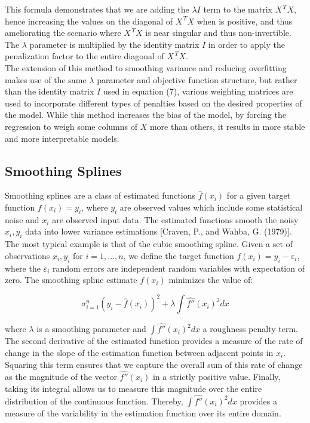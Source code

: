 \documentclass[12pt]{article}
\begin{document}
This formula demonstrates that we are adding the $\lambda I$ term to the matrix $X^{\, T}X$, hence increasing the values on the diagonal of $X^{\, T}X$ when  is positive, and thus ameliorating the scenario where $X^{\, T}X$ is near singular and thus non-invertible. The $\lambda$ parameter is multiplied by the identity matrix $I$ in order to apply the penalization factor to the entire diagonal of $X^{\, T}X$.\\

The extension of this method to smoothing variance and reducing overfitting makes use of the same $\lambda$ parameter and objective function structure, but rather than the identity matrix $I$ used in equation (7), various weighting matrices are used to incorporate different types of penalties based on the desired properties of the model. While this method increases the bias of the model, by forcing the regression to weigh some columns of $X$ more than others, it results in more stable and more interpretable models.

\subsection{Smoothing Splines}\label{subsec4}

Smoothing splines are a class of estimated functions $\hat{f}(x_i)$ for a given target function $f(x_i)=y_i$, where $y_i$ are observed values which include some statistical noise and $x_i$ are observed input data. The estimated functions smooth the noisy $x_i,y_i$ data into lower variance estimations [Craven, P., and Wahba, G. (1979)].\\

The most typical example is that of the cubic smoothing spline. Given a set of observations $x_i,y_i$ for $i=1, ... , n$, we define the target function $f(x_i)=y_i-\varepsilon_i$, where the $\varepsilon_i$ random errors are independent random variables with expectation of zero. The smoothing spline estimate $f(x_i)$ minimizes the value of:

\begin{equation}
\sigma_{i=1}^{n}(y_i-\hat{f}(x_i))^2 + \lambda \int \hat{f''}(x_i)^2 dx\label{eq8}
\end{equation}

where $\lambda$ is a smoothing parameter and $\int \hat{f''}(x_i)^2 dx$ a roughness penalty term. The second derivative of the estimated function provides a measure of the rate of change in the slope of the estimation function between adjacent points in $x_i$. Squaring this term ensures that we capture the overall sum of this rate of change as the magnitude of the vector $\hat{f''}(x_i)$ in a strictly positive value. Finally, taking its integral allows us to measure this magnitude over the entire distribution of the continuous function. Thereby, $\int \hat{f''}(x_i)^2 dx$ provides a measure of the variability in the estimation function over its entire domain.\\
\end{document}
